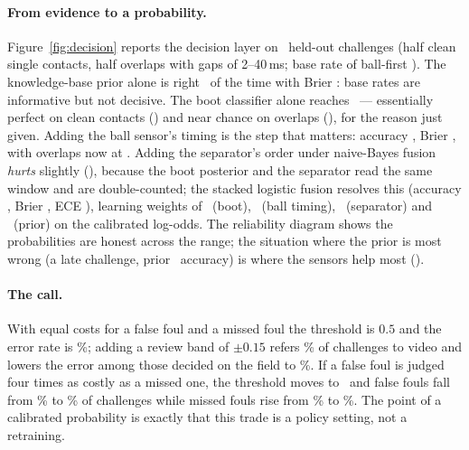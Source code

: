 \paragraph{From evidence to a probability.} Figure~\ref{fig:decision} reports
the decision layer on \DecNEval\ held-out challenges (half clean single
contacts, half overlaps with gaps of 2--40\,ms; base rate of ball-first
\DecBaseRate). The knowledge-base prior alone is right \DecPriorAcc\ of the
time with Brier \DecPriorBrier: base rates are informative but not decisive.
The boot classifier alone reaches \DecBootAcc\ --- essentially perfect on
clean contacts (\DecBootAccSingle) and near chance on overlaps
(\DecBootAccBoth), for the reason just given. Adding the ball sensor's timing
is the step that matters: accuracy \DecBootBallAcc, Brier \DecBootBallBrier,
with overlaps now at \DecBootBallAccBoth. Adding the separator's order under
naive-Bayes fusion \emph{hurts} slightly (\DecAllAcc), because the boot
posterior and the separator read the same window and are double-counted; the
stacked logistic fusion resolves this (accuracy \DecStackAcc, Brier
\DecStackBrier, ECE \DecStackEce), learning weights of \DecCoefBoot\ (boot),
\DecCoefBall\ (ball timing), \DecCoefSep\ (separator) and \DecCoefPrior\
(prior) on the calibrated log-odds. The reliability diagram shows the
probabilities are honest across the range; the situation where the prior is
most wrong (a late challenge, prior \DecLateAccPrior\ accuracy) is where the
sensors help most (\DecLateAccAll).

\paragraph{The call.} With equal costs for a false foul and a missed foul the
threshold is $0.5$ and the error rate is \DecErrNoReview\%; adding a review
band of $\pm0.15$ refers \DecReviewRate\% of challenges to video and lowers the
error among those decided on the field to \DecErrDecided\%. If a false foul is
judged four times as costly as a missed one, the threshold moves to
\DecThrFour\ and false fouls fall from \DecFalseFoulOne\% to
\DecFalseFoulFour\% of challenges while missed fouls rise from
\DecMissedOne\% to \DecMissedFour\%. The point of a calibrated probability is
exactly that this trade is a policy setting, not a retraining.
